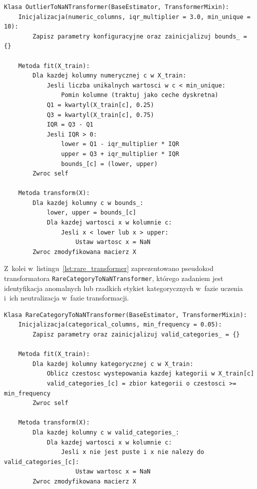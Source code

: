 \begin{lstlisting}[caption={Pseudokod transformatora OutlierToNaNTransformer}, label={lst:outlier_transformer}]
Klasa OutlierToNaNTransformer(BaseEstimator, TransformerMixin):
    Inicjalizacja(numeric_columns, iqr_multiplier = 3.0, min_unique = 10):
        Zapisz parametry konfiguracyjne oraz zainicjalizuj bounds_ = {}

    Metoda fit(X_train):
        Dla kazdej kolumny numerycznej c w X_train:
            Jesli liczba unikalnych wartosci w c < min_unique:
                Pomin kolumne (traktuj jako ceche dyskretna)
            Q1 = kwartyl(X_train[c], 0.25)
            Q3 = kwartyl(X_train[c], 0.75)
            IQR = Q3 - Q1
            Jesli IQR > 0:
                lower = Q1 - iqr_multiplier * IQR
                upper = Q3 + iqr_multiplier * IQR
                bounds_[c] = (lower, upper)
        Zwroc self

    Metoda transform(X):
        Dla kazdej kolumny c w bounds_:
            lower, upper = bounds_[c]
            Dla kazdej wartosci x w kolumnie c:
                Jesli x < lower lub x > upper:
                    Ustaw wartosc x = NaN
        Zwroc zmodyfikowana macierz X
\end{lstlisting}

Z~kolei w~listingu~\ref{lst:rare_transformer} zaprezentowano pseudokod transformatora \texttt{RareCategoryToNaNTransformer}, którego zadaniem jest identyfikacja anomalnych lub rzadkich etykiet kategorycznych w~fazie uczenia i~ich neutralizacja w~fazie transformacji.

\begin{lstlisting}[caption={Pseudokod transformatora RareCategoryToNaNTransformer}, label={lst:rare_transformer}]
Klasa RareCategoryToNaNTransformer(BaseEstimator, TransformerMixin):
    Inicjalizacja(categorical_columns, min_frequency = 0.05):
        Zapisz parametry oraz zainicjalizuj valid_categories_ = {}

    Metoda fit(X_train):
        Dla kazdej kolumny kategorycznej c w X_train:
            Oblicz czestosc wystepowania kazdej kategorii w X_train[c]
            valid_categories_[c] = zbior kategorii o czestosci >= min_frequency
        Zwroc self

    Metoda transform(X):
        Dla kazdej kolumny c w valid_categories_:
            Dla kazdej wartosci x w kolumnie c:
                Jesli x nie jest puste i x nie nalezy do valid_categories_[c]:
                    Ustaw wartosc x = NaN
        Zwroc zmodyfikowana macierz X
\end{lstlisting}

